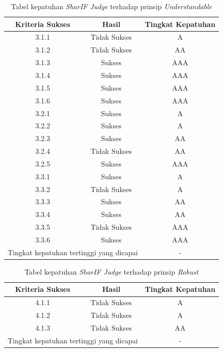 \documentclass[a4paper,twoside]{article}
\begin{document}
\begin{enumerate}
		\begin{table}[H]
			\centering
			\caption{Tabel kepatuhan \textit{SharIF Judge} terhadap prinsip \textit{Understandable}}
			\label{tab:kepatuhan_sharif_judge_understandable}
			\begin{tabular}{|c|c|c|}
				\hline
				Kriteria Sukses & Hasil & Tingkat Kepatuhan \\
				\hline
				3.1.1 & Tidak Sukses & A\\
				3.1.2 & Tidak Sukses & AA\\
				3.1.3 & Sukses & AAA\\
				3.1.4 & Sukses & AAA\\
				3.1.5 & Sukses & AAA\\
				3.1.6 & Sukses & AAA\\
				3.2.1 & Sukses & A\\
				3.2.2 & Sukses & A\\
				3.2.3 & Sukses & AA\\
				3.2.4 & Tidak Sukses & AA\\
				3.2.5 & Sukses & AAA\\
				3.3.1 & Sukses & A\\
				3.3.2 & Tidak Sukses & A\\
				3.3.3 & Sukses & AA\\
				3.3.4 & Sukses & AA\\
				3.3.5 & Tidak Sukses & AAA\\
				3.3.6 & Sukses & AAA\\
				\hline
				\multicolumn{2}{|c|}{Tingkat kepatuhan tertinggi yang dicapai} & - \\
				\hline
			\end{tabular}
		\end{table}
		
		\begin{table}[H]
			\centering
			\caption{Tabel kepatuhan \textit{SharIF Judge} terhadap prinsip \textit{Robust}}
			\label{tab:kepatuhan_sharif_judge_robust}
			\begin{tabular}{|c|c|c|}
				\hline
				Kriteria Sukses & Hasil & Tingkat Kepatuhan \\
				\hline
				4.1.1 & Tidak Sukses & A\\
				4.1.2 & Tidak Sukses & A\\
				4.1.3 & Tidak Sukses & AA\\
				\hline
				\multicolumn{2}{|c|}{Tingkat kepatuhan tertinggi yang dicapai} & - \\
				\hline
			\end{tabular}
		\end{table}
		

\end{enumerate}
\end{document}
